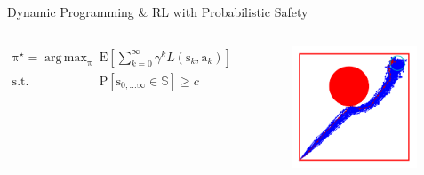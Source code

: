 \documentclass[lecture]{beamer}
\DeclareMathOperator*{\argmax}{arg\,max}
\newcommand{\vect}[1]{\ensuremath{\boldsymbol{\mathrm{#1}}}}
\begin{document}
\begin{frame}{\normalsize Dynamic Programming \& RL with Probabilistic Safety}
\footnotesize
\vspace{-.7cm}
\begin{columns}[t]
\begin{columns}[t]


\begin{alertblock}{}
\vspace{-.2cm}
\begin{align*}
\vect\pi^\star = \argmax_{\vect\pi}&\quad\mathrm E\left[ \sum_{k=0}^\infty \gamma^kL\left(\vect s_k,\vect a_k\right)\right]\\
\mathrm{s.t.}&\quad \mathrm{P}\left[ \vect s_{0,\ldots\infty}\in \mathbb S\right] \geq c
\end{align*}
\end{alertblock}
\end{columns}

 \begin{figure}
   \includegraphics[width=0.98\textwidth]{Codes/BasicsSafety/ProbabilisticModel.pdf}%
  \end{figure}
\end{columns}


\end{frame}
\end{document}
